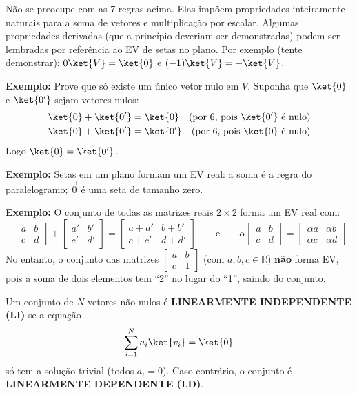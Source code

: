 \begin{observacao}[]{}
    Não se preocupe com as 7 regras acima. Elas impõem propriedades inteiramente naturais para a soma de vetores e multiplicação por escalar. Algumas propriedades derivadas (que a princípio deveriam ser demonstradas) podem ser lembradas por referência ao EV de setas no plano. Por exemplo (tente demonstrar): $0\ket{V} = \ket{0}$ e $(-1)\ket{V} = -\ket{V}$.
\end{observacao}

{\bf Exemplo:} Prove que só existe um único vetor nulo em $V$. Suponha que $\ket{0}$ e $\ket{0'}$ sejam vetores nulos:
\begin{align*}
    \ket{0} + \ket{0'} &= \ket{0} \quad \text{(por 6, pois $\ket{0'}$ é nulo)} \\
    \ket{0} + \ket{0'} &= \ket{0'} \quad \text{(por 6, pois $\ket{0}$ é nulo)}
\end{align*}
Logo $\ket{0} = \ket{0'}$.

{\bf Exemplo:} Setas em um plano formam um EV real: a soma é a regra do paralelogramo; $\vec{0}$ é uma seta de tamanho zero.

{\bf Exemplo:} O conjunto de todas as matrizes reais $2\times2$ forma um EV real com:
\[
    \begin{bmatrix} a & b \\ c & d \end{bmatrix}
    +
    \begin{bmatrix} a' & b' \\ c' & d' \end{bmatrix}
    =
    \begin{bmatrix} a+a' & b+b' \\ c+c' & d+d' \end{bmatrix}
    \qquad \text{e} \qquad
    \alpha \begin{bmatrix} a & b \\ c & d \end{bmatrix}
    =
    \begin{bmatrix} \alpha a & \alpha b \\ \alpha c & \alpha d \end{bmatrix}
\]
No entanto, o conjunto das matrizes $\begin{bmatrix} a & b \\ c & 1 \end{bmatrix}$ (com $a,b,c \in \mathbb{R}$) \textbf{não} forma EV, pois a soma de dois elementos tem ``2'' no lugar do ``1'', saindo do conjunto.

\begin{shadequote}
    Um conjunto de $N$ vetores não-nulos é \textbf{LINEARMENTE INDEPENDENTE (LI)} se a equação
    \[
        \sum_{i=1}^N a_i \ket{v_i} = \ket{0}
    \]
    só tem a solução trivial (todos $a_i = 0$). Caso contrário, o conjunto é \textbf{LINEARMENTE DEPENDENTE (LD)}.
\end{shadequote}

